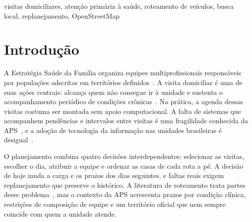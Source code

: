 \documentclass[conference,a4paper]{IEEEtran}
\begin{document}
\renewcommand{\abstractname}{Abstract}
\begin{abstract}
Primary health care teams plan home visits by hand: whom to visit, on which day, by which team and in which order, on foot, under limited shifts and distinct clinical deadlines. We model the task as periodic routing with visit selection, priority-weighted deadlines and operational constraints gathered from community health workers (hard deadlines, required professions and staff, team assignment, patient absences and risk areas), and propose a monthly local search that relocates and swaps visits across days and teams under a walking budget, followed by 1.5-opt and a formal plan verifier. The method was implemented in an open artifact with a built-in OpenStreetMap walking router and evaluated in three studies with synthetic patients on real territories of Porto Alegre, Brazil. Across 131 territories it served on time 34.63\% of clinical priority points, versus 28.18\% for nearest neighbor and 17.93\% for an urgency rule, while walking 1.1\% less than nearest neighbor; it beat nearest neighbor in 899 of 972 factorial pairs and finished a 250-patient backlog 5.6 working days earlier with 13\% less walking. No rule was violated in 900 random constrained plans.
\end{abstract}

\begin{IEEEkeywords}
visitas domiciliares, atenção primária à saúde, roteamento de veículos, busca local, replanejamento, OpenStreetMap
\end{IEEEkeywords}

\section{Introdução}

A Estratégia Saúde da Família organiza equipes multiprofissionais responsáveis por populações adscritas em territórios definidos~\cite{pnab2017,faria2020}. A visita domiciliar é uma de suas ações centrais: alcança quem não consegue ir à unidade e sustenta o acompanhamento periódico de condições crônicas~\cite{conass2021}. Na prática, a agenda dessas visitas costuma ser montada sem apoio computacional. A falta de sistemas que acompanhem pendências e intervalos entre visitas é uma fragilidade conhecida da APS~\cite{rodrigues2014}, e a adoção de tecnologia da informação nas unidades brasileiras é desigual~\cite{bender2021,pinto2024}.

O planejamento combina quatro decisões interdependentes: selecionar as visitas, escolher o dia, atribuir a equipe e ordenar as casas de cada rota a pé. A decisão de hoje muda a carga e os prazos dos dias seguintes, e faltas reais exigem replanejamento que preserve o histórico. A literatura de roteamento trata partes desse problema~\cite{toth2014,campbell2014,fikar2017}, mas o contexto da APS acrescenta prazos por condição clínica, restrições de composição de equipe e um território oficial que nem sempre coincide com quem a unidade atende.
\end{document}
